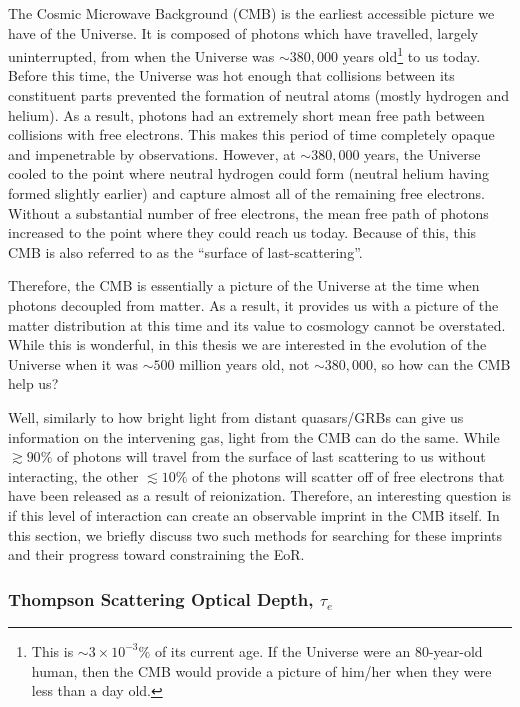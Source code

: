 The Cosmic Microwave Background (CMB) is the earliest accessible picture we have of the Universe. It is composed of photons which have travelled, largely uninterrupted, from when the Universe was $\sim380,000$ years old\footnote{This is $\sim3\times 10^{-3}\%$ of its current age. If the Universe were an 80-year-old human, then the CMB would provide a picture of him/her when they were less than a day old.} to us today. Before this time, the Universe was hot enough that collisions between its constituent parts prevented the formation of neutral atoms (mostly hydrogen and helium). As a result, photons had an extremely short mean free path between collisions with free electrons. This makes this period of time completely opaque and impenetrable by observations. However, at $\sim380,000$ years, the Universe cooled to the point where neutral hydrogen could form (neutral helium having formed slightly earlier) and capture almost all of the remaining free electrons. Without a substantial number of free electrons, the mean free path of photons increased to the point where they could reach us today. Because of this, this CMB is also referred to as the ``surface of last-scattering''.


Therefore, the CMB is essentially a picture of the Universe at the time when photons decoupled from matter. As a result, it provides us with a picture of the matter distribution at this time and its value to cosmology cannot be overstated. While this is wonderful, in this thesis we are interested in the evolution of the Universe when it was $\sim500$ million years old, not $\sim380,000$, so how can the CMB help us? 


Well, similarly to how bright light from distant quasars/GRBs can give us information on the intervening gas, light from the CMB can do the same. While $\gtrsim90\%$ of photons will travel from the surface of last scattering to us without interacting, the other $\lesssim10\%$ of the photons will scatter off of free electrons that have been released as a result of reionization. Therefore, an interesting question is if this level of interaction can create an observable imprint in the CMB itself. In this section, we briefly discuss two such methods for searching for these imprints and their progress toward constraining the EoR.


\subsubsection{Thompson Scattering Optical Depth, $\tau_{e}$}


